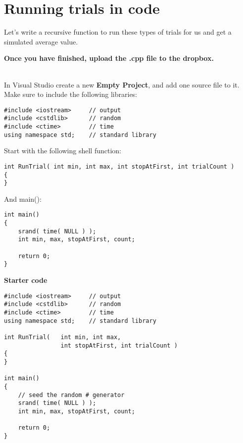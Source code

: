 \documentclass[a4paper,12pt]{book}
\title{}
\author{Rachel Morris}
\date{\today}
\begin{document}
    \togglefalse{answerkey}
    
    \section*{Running trials in code}

        Let's write a recursive function to run these types of trials
        for us and get a simulated average value.

        \textbf{Once you have finished, upload the .cpp file to the dropbox.}

        ~\\
        In Visual Studio create a new \textbf{Empty Project}, and add
        one source file to it. Make sure to include the following libraries:

\begin{verbatim}
#include <iostream>     // output
#include <cstdlib>      // random
#include <ctime>        // time
using namespace std;    // standard library
\end{verbatim}

        Start with the following shell function:
        
\begin{verbatim}
int RunTrial( int min, int max, int stopAtFirst, int trialCount )
{
}
\end{verbatim}

        And main():

\begin{verbatim}
int main()
{
    srand( time( NULL ) );
    int min, max, stopAtFirst, count;
    
    return 0;
}
\end{verbatim}

\newpage

\textbf{Starter code}

\begin{lstlisting}[style=code]
#include <iostream>     // output
#include <cstdlib>      // random
#include <ctime>        // time
using namespace std;    // standard library

int RunTrial(   int min, int max,
                int stopAtFirst, int trialCount )
{
}

int main()
{
    // seed the random # generator
    srand( time( NULL ) );  
    int min, max, stopAtFirst, count;
    
    return 0;
}
\end{lstlisting}
    ~\\
    
\end{document}
